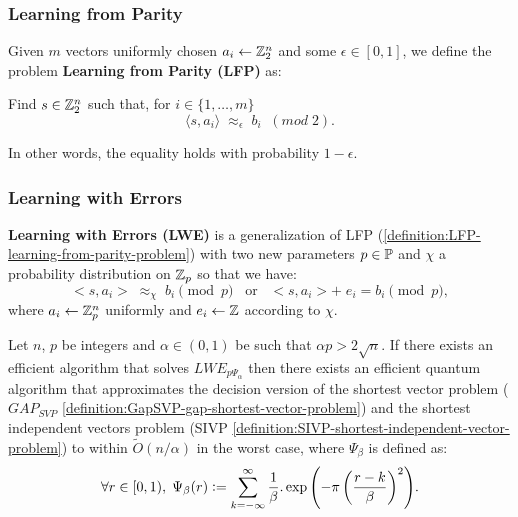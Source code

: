 \documentclass[a4paper,12pt]{article}
\begin{document}
\subsubsection{Learning from Parity}
\label{sec:org629757c}
\begin{definition}
  \label{definition:LFP-learning-from-parity-problem}
  Given $m$ vectors uniformly chosen  $a_i \gets \Z^n_2$ and some $\epsilon \in [0,1]$, we
  define the problem \textbf{Learning from Parity (LFP)} as:

  Find $s \in \Z^n_2$ such that, for $i \in \{1,\dots,m\}$
     $$ \langle{s, a_i}\rangle \; \approx_\epsilon \; b_i \;\; (mod\; 2). $$

     In other words, the equality holds with probability $1 - \epsilon$.

\end{definition}

\subsubsection{Learning with Errors}
\label{sec:org7099018}
\begin{definition}\label{definition:LWE-learning-with-errors-problem}
  \textbf{Learning with Errors (LWE)} is a generalization of LFP (\ref{definition:LFP-learning-from-parity-problem}) with two new parameters $p \in \P$ and $\chi$ a probability distribution on $\Z_p$ so that we have:
\[
  <s, a_i> \; \approx_\chi \; b_i \pmod p \;\;\; \text{or} \;\;\; <s, a_i> + \; e_i =  b_i \pmod p ,
    \]
     where $a_i \gets \Z^n_p$ uniformly and $e_i \gets \Z$ according to $\chi$.

\end{definition}

\begin{theorem}
  Let $n$, $p$ be integers and $\alpha \in (0, 1)$ be such that $\alpha p > 2\sqrt{n}$. If
  there exists an efficient algorithm that solves $LWE_{p \Psi_\alpha}$ then there
  exists an efficient quantum algorithm that approximates the decision version
  of the shortest vector problem ($GAP_{SVP}$ \ref{definition:GapSVP-gap-shortest-vector-problem}) and the
  shortest independent vectors problem (SIVP \ref{definition:SIVP-shortest-independent-vector-problem}) to within
  $\tilde{O}(n/\alpha)$ in the worst case,  where $\Psi_\beta$ is defined as:
  $$
  \forall r \in [0,1), \; \Psi_\beta(r) \defsym \sum_{k=-\infty}^\infty{\frac{1}{\beta} . \exp{\left( -\pi \left( \frac{r-k}{\beta} \right)^2 \right)}}.
  $$
\end{theorem}
\end{document}
